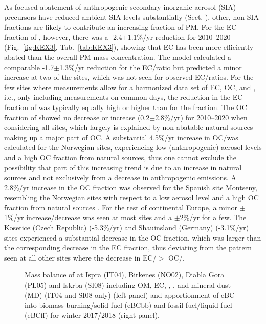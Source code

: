 As focused abatement of anthropogenic secondary inorganic aerosol (SIA)
precursors have reduced ambient SIA levels substantially (Sect. ),
other, non-SIA fractions are likely to contribute an increasing fraction
of PM. For the EC fraction of \pmfine, however, there was a -2.4$\pm$1.1\%/yr
reduction for 2010--2020 (Fig.~\ref{fig:KEX3}, Tab.~\ref{tab:KEX3}), showing that EC has been
more efficiently abated than the overall PM mass concentration. The model
calculated a comparable -1.7$\pm$1.3\%/yr reduction for the EC/\pmfine ratio
but predicted a minor increase at two of the sites, which was not seen for
observed EC/\pmfine ratios. For the few sites where measurements allow for
a harmonized data set of EC, OC,  and \pmfine, i.e., only including
measurements on common days, the reduction in the EC fraction of \pmfine
was typically equally high or higher than for the  fraction. The
OC fraction of \pmfine showed no decrease or increase (0.2$\pm$2.8\%/yr)
for 2010--2020 when considering all sites, which largely is explained by
non-abatable natural sources making up a major part of OC. A substantial
4.5\%/yr increase in OC/\pmfine was calculated for the Norwegian sites,
experiencing low (anthropogenic) aerosol levels and a high OC fraction
from natural sources, thus one cannot exclude the possibility that part
of this increasing trend is due to an increase in natural sources and
not exclusively from a decrease in anthropogenic emissions. A 2.8\%/yr
increase in the OC fraction was observed for the Spanish site Montseny,
resembling the Norwegian sites with respect to a low aerosol level and
a high OC fraction from natural sources \citep{Kulmala2011}. For the
rest of continental Europe, a minor $\pm$1\%/yr increase/decrease
was seen at most sites and a $\pm$2\%/yr for a few. The Kosetice
(Czech Republic) (-5.3\%/yr) and Shauinsland (Germany) (-3.1\%/yr) sites
experienced a substantial decrease in the OC fraction, which was larger
than the corresponding decrease in the EC fraction, thus deviating from
the pattern seen at all other sites where the decrease in EC/\pmfine $>$
OC/\pmfine.

\begin{figure}
 \caption{
  Mass balance of \pmfine at Ispra (IT04), Birkenes (NO02), Diabla Gora
  (PL05) and Iskrba (SI08) including OM, EC, , ,  and mineral
  dust (MD) (IT04 and SI08 only) (left panel) and apportionment of eBC
  into biomass burning/solid fuel (eBCbb) and fossil fuel/liquid fuel
  (eBCff) for winter 2017/2018 (right panel). \label{fig:KEX4}
 }
\end{figure}


